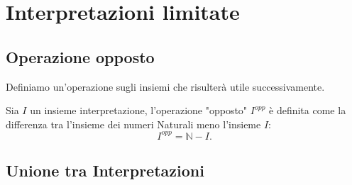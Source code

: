 \chapter{Interpretazioni limitate}

\section{Operazione opposto}
    Definiamo un'operazione sugli insiemi che risulterà utile successivamente. 
    \begin{defn}
        Sia $I$ un insieme interpretazione, l'operazione "opposto" $I^{opp}$ è definita come la differenza tra l'insieme dei numeri Naturali meno l'insieme $I$:\[I^{opp} = \mathbb{N} - I.\]
    \end{defn}
        
\section{Unione tra Interpretazioni}

